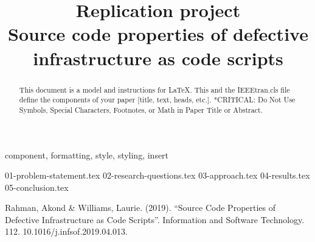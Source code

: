 \documentclass[conference]{IEEEtran}
\begin{document}
\title{Replication project\\
{\footnotesize Source code properties of defective infrastructure as code scripts}
}

\author{
    \and
}

\maketitle

\begin{abstract}
    This document is a model and instructions for \LaTeX.
    This and the IEEEtran.cls file define the components of your paper [title, text, heads, etc.]. *CRITICAL: Do Not Use Symbols, Special Characters, Footnotes,
    or Math in Paper Title or Abstract.
\end{abstract}

\begin{IEEEkeywords}
    component, formatting, style, styling, insert
\end{IEEEkeywords}


{01-problem-statement.tex}
{02-research-questions.tex}
{03-approach.tex}
{04-results.tex}
{05-conclusion.tex}









\begin{thebibliography}{00}
     Rahman, Akond \& Williams, Laurie. (2019). ``Source Code Properties of Defective Infrastructure as Code Scripts''. Information and Software Technology. 112. 10.1016/j.infsof.2019.04.013.
\end{thebibliography}
\end{document}

